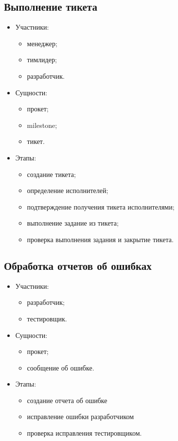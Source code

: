 	\subsection{Выполнение тикета}
	\begin{itemize}
		\item Участники:
		\begin{itemize}
			\item менеджер;
			\item тимлидер;
			\item разработчик.
		\end{itemize}
		\item Сущности:
		\begin{itemize}
			\item прокет;
			\item milestone;
			\item тикет.
		\end{itemize}
		\item Этапы:
		\begin{itemize}
			\item создание тикета;
			\item определение исполнителей;
			\item подтверждение получения тикета исполнителями;
			\item выполнение задание из тикета;
			\item проверка выполнения задания и закрытие тикета.
		\end{itemize}
	\end{itemize}
	
	
	\subsection{Обработка отчетов об ошибках}
	\begin{itemize}
		\item Участники:
		\begin{itemize}
			\item разработчик;
			\item тестировщик.
		\end{itemize}
		\item Сущности:
		\begin{itemize}
			\item прокет;
			\item сообщение об ошибке.
		\end{itemize}
		\item Этапы:
		\begin{itemize}
			\item создание отчета об ошибке
			\item исправление ошибки разработчиком
			\item проверка исправления тестировщиком.
		\end{itemize}
	\end{itemize}
